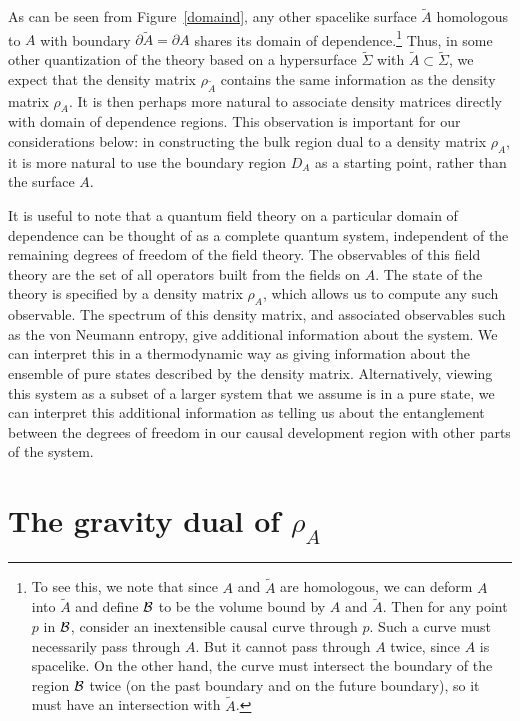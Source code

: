 \documentclass[12pt]{article}
\renewcommand{\(}{\left(}
\renewcommand{\)}{\right)}
\begin{document}
As can be seen from Figure~\ref{domaind}, any other spacelike surface $\tilde{A}$ homologous to $A$ with boundary $\partial \tilde{A} = \partial A$ shares its domain of dependence.\footnote{To see this, we note that since $A$ and $\tilde{A}$ are homologous, we can deform $A$ into $\tilde{A}$ and define $\cal B$ to be the volume bound by $A$ and $\tilde{A}$. Then for any point $p$ in ${\cal B}$, consider an inextensible causal curve through $p$. Such a curve must necessarily pass through $A$. But it cannot pass through $A$ twice, since $A$ is spacelike. On the other hand, the curve must intersect the boundary of the region $\cal B$ twice (on the past boundary and on the future boundary), so it must have an intersection with $\tilde{A}$.}  Thus, in some other quantization of the theory based on a hypersurface $\tilde{\Sigma}$ with $\tilde{A} \subset \tilde{\Sigma}$, we expect that the density matrix $\rho_{\tilde{A}}$ contains the same information as the density matrix ${\rho_A}$. It is then perhaps more natural to associate density matrices directly with domain of dependence regions. This observation is important for our considerations below: in constructing the bulk region dual to a density matrix $\rho_A$, it is more natural to use the boundary region $D_A$ as a starting point, rather than the surface $A$.

It is useful to note that a quantum field theory on a particular domain of dependence can be thought of as a complete quantum system, independent of the remaining degrees of freedom of the field theory. The observables of this field theory are the set of all operators built from the fields on $A$. The state of the theory is specified by a density matrix $\rho_A$, which allows us to compute any such observable. The spectrum of this density matrix, and associated observables such as the von Neumann entropy, give additional information about the system. We can interpret this in a thermodynamic way as giving information about the ensemble of pure states described by the density matrix. Alternatively, viewing this system as a subset of a larger system that we assume is in a pure state, we can interpret this additional information as telling us about the entanglement between the degrees of freedom in our causal development region with other parts of the system.

\section{The gravity dual of $\rho_A$}
\end{document}
